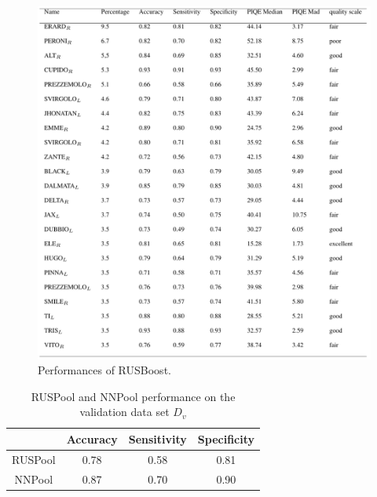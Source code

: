 \begin{figure}[h!]
    \centering
    \includegraphics[width = 0.8\linewidth]{images/paper10/RUSBoost performance.png}
    \centering
    \caption{Performances of RUSBoost.}
    \label{fig: RUSBoostPerf}
\end{figure}
\begin{table}[htbp]
    \centering
    \begin{adjustbox}{width=0.6\textwidth}
    \begin{tabular}{|cccc|}
        \hline
        & Accuracy & Sensitivity & Specificity\\
        \hline
        RUSPool & 0.78 & 0.58 & 0.81\\
        NNPool & 0.87 & 0.70 & 0.90\\
        \hline
    \end{tabular}
    \end{adjustbox}
    \caption{RUSPool and NNPool performance on the validation data set $D_v$}
    \label{RUSPoolPerf}
\end{table}

